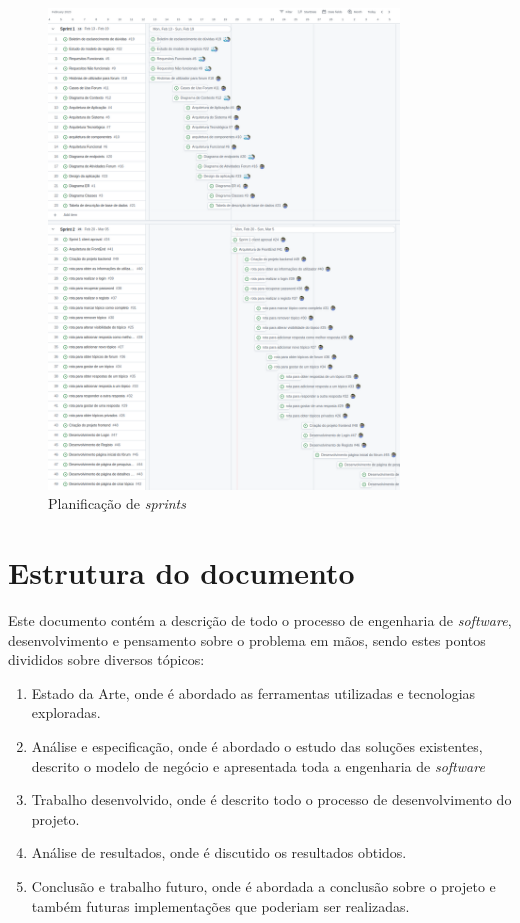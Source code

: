 \begin{figure}[htb]
  \centering
  
  \includegraphics[width=0.83\textwidth]{images/etapa1_sprint_planning.png}
  \caption{Planificação de \textit{sprints}}
  \label{fig:1}
\end{figure}

\section{Estrutura do documento}

Este documento contém a descrição de todo o processo de engenharia de \textit{software}, desenvolvimento e pensamento sobre o problema em mãos, sendo estes pontos divididos sobre diversos tópicos:
\begin{enumerate}
  \item Estado da Arte, onde é abordado as ferramentas utilizadas e tecnologias exploradas.
  \item Análise e especificação, onde é abordado o estudo das soluções existentes, descrito o modelo de negócio e apresentada toda a engenharia de \textit{software}
  \item Trabalho desenvolvido, onde é descrito todo o processo de desenvolvimento do projeto.
  \item Análise de resultados, onde é discutido os resultados obtidos.
  \item Conclusão e trabalho futuro, onde é abordada a conclusão sobre o projeto e também futuras implementações que poderiam ser realizadas.
\end{enumerate}